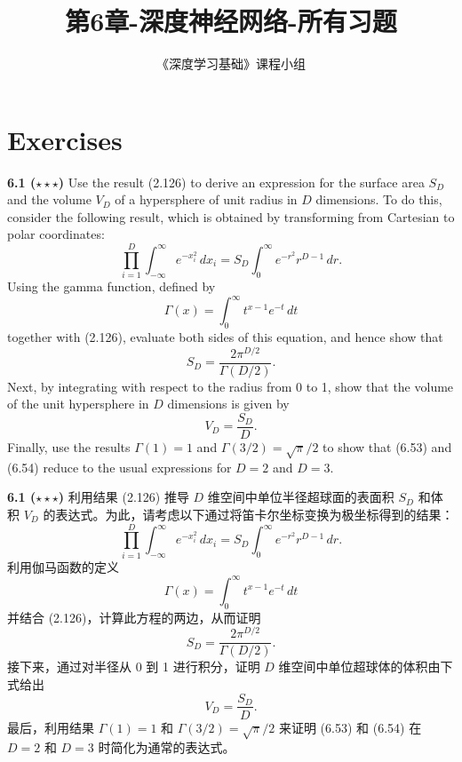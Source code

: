 \documentclass{article}
\title{第6章-深度神经网络-所有习题}
\author{《深度学习基础》课程小组}
\begin{document}
\maketitle

\section*{Exercises}

\textbf{6.1 ($\star\star\star$)} Use the result (2.126) to derive an expression for the surface area $S_D$ and the volume $V_D$ of a hypersphere of unit radius in $D$ dimensions. To do this, consider the following result, which is obtained by transforming from Cartesian to polar coordinates:
\begin{equation}
\prod_{i=1}^{D} \int_{-\infty}^{\infty} e^{-x_i^2} \, dx_i = S_D \int_{0}^{\infty} e^{-r^2} r^{D-1} \, dr.
\tag{6.51}
\end{equation}
Using the gamma function, defined by
\begin{equation}
\Gamma(x) = \int_{0}^{\infty} t^{x-1} e^{-t} \, dt
\tag{6.52}
\end{equation}
together with (2.126), evaluate both sides of this equation, and hence show that
\begin{equation}
S_D = \frac{2\pi^{D/2}}{\Gamma(D/2)}.
\tag{6.53}
\end{equation}
Next, by integrating with respect to the radius from 0 to 1, show that the volume of the unit hypersphere in $D$ dimensions is given by
\begin{equation}
V_D = \frac{S_D}{D}.
\tag{6.54}
\end{equation}
Finally, use the results $\Gamma(1)=1$ and $\Gamma(3/2)=\sqrt{\pi}/2$ to show that (6.53) and (6.54) reduce to the usual expressions for $D=2$ and $D=3$.

\textbf{6.1 ($\star\star\star$)} 利用结果 (2.126) 推导 $D$ 维空间中单位半径超球面的表面积 $S_D$ 和体积 $V_D$ 的表达式。为此，请考虑以下通过将笛卡尔坐标变换为极坐标得到的结果：
\begin{equation}
\prod_{i=1}^{D} \int_{-\infty}^{\infty} e^{-x_i^2} \, dx_i = S_D \int_{0}^{\infty} e^{-r^2} r^{D-1} \, dr.
\tag{6.51}
\end{equation}
利用伽马函数的定义
\begin{equation}
\Gamma(x) = \int_{0}^{\infty} t^{x-1} e^{-t} \, dt
\tag{6.52}
\end{equation}
并结合 (2.126)，计算此方程的两边，从而证明
\begin{equation}
S_D = \frac{2\pi^{D/2}}{\Gamma(D/2)}.
\tag{6.53}
\end{equation}
接下来，通过对半径从 0 到 1 进行积分，证明 $D$ 维空间中单位超球体的体积由下式给出
\begin{equation}
V_D = \frac{S_D}{D}.
\tag{6.54}
\end{equation}
最后，利用结果 $\Gamma(1)=1$ 和 $\Gamma(3/2)=\sqrt{\pi}/2$ 来证明 (6.53) 和 (6.54) 在 $D=2$ 和 $D=3$ 时简化为通常的表达式。
\end{document}
